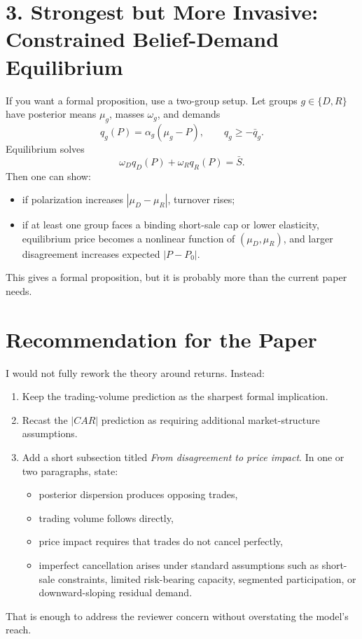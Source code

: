 \documentclass[11pt]{article}
\begin{document}
\section*{3. Strongest but More Invasive: Constrained Belief-Demand Equilibrium}
If you want a formal proposition, use a two-group setup. Let groups $g\in\{D,R\}$ have posterior means $\mu_g$, masses $\omega_g$, and demands
\[
q_g(P)=\alpha_g(\mu_g-P), \qquad q_g\geq -\bar q_g.
\]
Equilibrium solves
\[
\omega_D q_D(P)+\omega_R q_R(P)=\bar S.
\]
Then one can show:
\begin{itemize}[leftmargin=1.5em]
    \item if polarization increases $|\mu_D-\mu_R|$, turnover rises;
    \item if at least one group faces a binding short-sale cap or lower elasticity, equilibrium price becomes a nonlinear function of $(\mu_D,\mu_R)$, and larger disagreement increases expected $|P-P_0|$.
\end{itemize}
This gives a formal proposition, but it is probably more than the current paper needs.

\section*{Recommendation for the Paper}
I would not fully rework the theory around returns. Instead:
\begin{enumerate}[leftmargin=1.5em]
    \item Keep the trading-volume prediction as the sharpest formal implication.
    \item Recast the $|CAR|$ prediction as requiring additional market-structure assumptions.
    \item Add a short subsection titled \emph{From disagreement to price impact}. In one or two paragraphs, state:
    \begin{itemize}[leftmargin=1.5em]
        \item posterior dispersion produces opposing trades,
        \item trading volume follows directly,
        \item price impact requires that trades do not cancel perfectly,
        \item imperfect cancellation arises under standard assumptions such as short-sale constraints, limited risk-bearing capacity, segmented participation, or downward-sloping residual demand.
    \end{itemize}
\end{enumerate}
That is enough to address the reviewer concern without overstating the model's reach.
\end{document}
